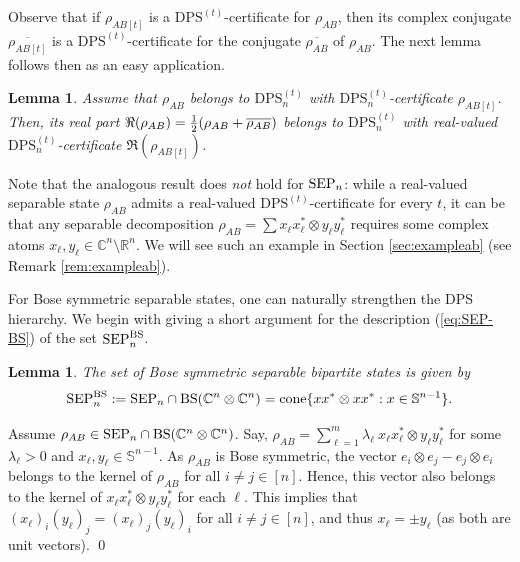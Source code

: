 \documentclass[11pt]{article}
\makeatletter
\newcommand{\R}{\ensuremath{\mathbb{R}}}   %
\newcommand{\C}{\ensuremath{\mathbb{C}}} %
\newcommand{\Cnn}{\C^n\ot \C^n}
\newcommand{\sS}{\mathbb S}
\newcommand{\SEP}{\text{\rm SEP}}
\newcommand{\DPSt}{\mathrm{DPS}^{(t)}}
\newcommand{\SEPBS}{\SEP^{\BS}}
\newcommand{\cone}{\text{\rm cone}}
\newcommand{\ot}{\otimes}
\newcommand{\BS}{\text{\rm BS}}
\theoremstyle{plain}
\newtheorem{lemma}[satz]{Lemma}
\renewenvironment{proof}[1][\proofname]{%
  \par
  \pushQED{}%
  \normalfont
  \topsep6\p@\@plus6\p@
  \trivlist
  \item[\hskip\labelsep\itshape #1\@addpunct{.}]%
}{%
  \popQED
  \endtrivlist
}
\makeatother
\begin{document}
Observe that if $\rho_{AB[t]}$ is a $\DPSt$-certificate for $\rho_{AB}$, then its complex conjugate $\overline{\rho_{AB[t]}}$ is a $\DPSt$-certificate for the conjugate $\overline{\rho_{AB}}$ of $\rho_{AB}$. The next lemma follows then as an easy application.

\begin{lemma}\label{lem:real-certificate}
Assume that  $\rho_{AB}$ belongs to $\DPSt_n$  with $\DPSt_n$-certificate $\rho_{AB[t]}$. Then, its real part   $\Re(\rho_{AB})= {1\over 2}( \rho_{AB}+ \overline{\rho_{AB}})$ belongs to $\DPSt_n$ with real-valued $\DPSt_n$-certificate $\Re(\rho_{AB[t]})$.
\end{lemma}
\noindent
Note that the analogous result does {\em not} hold for $\SEP_n$: while a real-valued separable state $\rho_{AB}$ admits a real-valued $\DPSt$-certificate for every $t$, it can be that any separable decomposition $\rho_{AB}=\sum x_\ell x_\ell^*\ot y_{\ell}y_{\ell}^*$  requires some complex atoms $x_\ell ,y_\ell \in\C^n\setminus \R^n$. We will see such an example  in  Section \ref{sec:exampleab} (see Remark \ref{rem:exampleab}).

\medskip
 For Bose symmetric separable  states, one can naturally  strengthen  the DPS hierarchy. We begin with giving a short argument for the description (\ref{eq:SEP-BS}) of the set $\SEPBS_n$.
  
 \begin{lemma}\label{lem:SEP-BS}
The set of Bose symmetric separable bipartite states is given by
$$\SEPBS_n:=\SEP_n\cap\BS(\C^n\ot \C^n)=\cone \{xx^*\ot xx^*: x\in\sS^{n-1}\}.$$
\end{lemma}

\begin{proof}
Assume $\rho_{AB}\in \SEP_n\cap \BS(\Cnn)$. Say,
$\rho_{AB}=\sum_{\ell=1}^m\lambda_\ell \ x_\ell x_\ell^*\ot y_\ell y_{\ell}^*$ for some $\lambda_\ell>0$ and $x_\ell,y_\ell\in \sS^{n-1}$. 
As $\rho_{AB}$ is Bose symmetric, the vector $e_i\ot e_j-e_j\ot e_i$ belongs to the kernel of $\rho_{AB}$ for all $i\ne j\in [n]$. Hence, this vector also belongs to the kernel of $x_\ell x_\ell^*\ot y_\ell y_{\ell}^*$ for each $\ell$. This implies that 
$(x_\ell)_i(y_\ell)_j=(x_\ell)_j (y_{\ell})_i$ for all $i\ne j\in [n]$, and thus $x_\ell=\pm y_\ell$ (as both are unit vectors).
\qed\end{proof}
\end{document}
